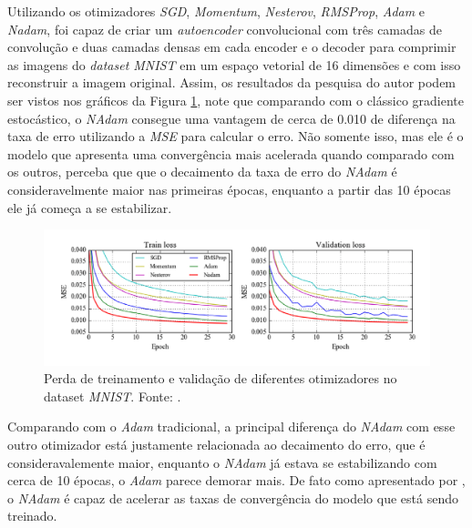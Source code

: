 Utilizando os otimizadores \textit{SGD}, \textit{Momentum}, \textit{Nesterov}, \textit{RMSProp}, \textit{Adam} e \textit{Nadam}, \textcite{NadamMethod} foi capaz de criar um \textit{autoencoder} convolucional com três camadas de convolução e duas camadas densas em cada encoder e o decoder para comprimir as imagens do \textit{dataset MNIST} em um espaço vetorial de 16 dimensões e com isso reconstruir a imagem original. Assim, os resultados da pesquisa do autor podem ser vistos nos gráficos da Figura \ref{fig:comparativo-nadam-mnist}, note que comparando com o clássico gradiente estocástico, o \textit{NAdam} consegue uma vantagem de cerca de 0.010 de diferença na taxa de erro utilizando a \textit{MSE} para calcular o erro. Não somente isso, mas ele é o modelo que apresenta uma convergência mais acelerada quando comparado com os outros, perceba que que o decaimento da taxa de erro do \textit{NAdam} é consideravelmente maior nas primeiras épocas, enquanto a partir das 10 épocas ele já começa a se estabilizar.

\begin{figure}[h]
    \centering
    \includegraphics[width=1\linewidth]{../imagens/retropropagacao-gradiente/comparativo-nadam-mnist.png}
    
    \caption[Perda de treinamento e validação com diferentes otimizadores]{%
        Perda de treinamento e validação de diferentes otimizadores no dataset \textit{MNIST}.
        \newline
        \small Fonte: \parencite{NadamMethod}.
    }
    \label{fig:comparativo-nadam-mnist}
\end{figure}
 
Comparando com o \textit{Adam} tradicional, a principal diferença do \textit{NAdam} com esse outro otimizador está justamente relacionada ao decaimento do erro, que é consideravalemente maior, enquanto o \textit{NAdam} já estava se estabilizando com cerca de 10 épocas, o \textit{Adam} parece demorar mais. De fato como apresentado por \textcite{NadamMethod}, o \textit{NAdam} é capaz de acelerar as taxas de convergência do modelo que está sendo treinado.

